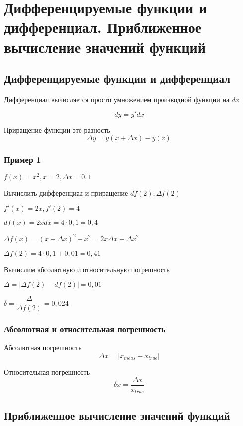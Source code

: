 \section{Дифференцируемые функции и дифференциал. Приближенное вычисление значений функций}

\subsection{Дифференцируемые функции и дифференциал}

Дифференциал вычисляется просто умножением производной функции на $ dx $

$$
dy = y'dx
$$

Приращение функции это разность
$$
\Delta y = y(x + \Delta x) - y(x)
$$

\subsubsection{Пример 1}

$ f(x) = x^{2}, x = 2, \Delta x = 0,1 $

Вычислить дифференциал и приращение $ df(2), \Delta f(2) $

$ f'(x) = 2x, f'(2) = 4 $

$ df(x)= 2x dx = 4 \cdot 0,1 = 0,4 $

$ \Delta f(x) = (x + \Delta x)^{2} - x^{2} = 2x \Delta x + \Delta x^{2} $

$ \Delta f(2) = 4 \cdot 0,1 + 0,01 = 0,41 $

Вычислим абсолютную и относительную погрешность

$ \Delta = | \Delta f(2) - df(2) | = 0,01 $

$ \delta = \dfrac{\Delta}{\Delta f(2)} = 0,024 $

\subsubsection{Абсолютная и относительная погрешность}

Абсолютная погрешность
$$
\Delta x = |x_{meas}-x_{true}| \label{absolute_err}
$$

Относительная погрешность 
$$
\delta x =  \dfrac{\Delta x}{x_{true}} \label{relative_err}
$$

\subsection{Приближенное вычисление значений функций}

